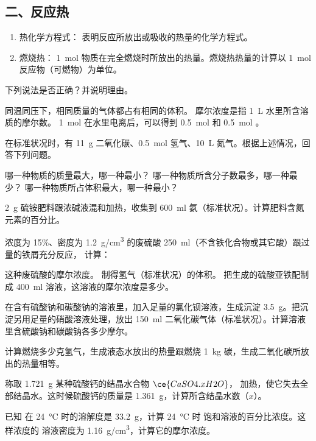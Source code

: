 \subsection*{二、反应热}
\begin{enumerate}[1.]
  \item 热化学方程式： 表明反应所放出或吸收的热量的化学方程式。
  \item 燃烧热： \qty{1}{mol} 物质在完全燃烧时所放出的热量。燃烧热热量的计算以 \qty{1}{mol} 反应物（可燃物）为单位。
\end{enumerate}

\begin{Review}
  \begin{question}
    \item 下列说法是否正确？并说明理由。
    \begin{tasks}
      \task 同温同压下，相同质量的气体都占有相同的体积。
      \task 摩尔浓度是指 \qty{1}{L} 水里所含溶质的摩尔数。
      \task \qty{1}{mol}  在水里电离后，可以得到 \qty{0.5}{mol}  和 \qty{0.5}{mol} 。
    \end{tasks}
    \item 在标准状况时，有 \qty{11}{g} 二氧化碳、\qty{0.5}{mol} 氢气、\qty{10}{L} 氮气。根据上述情况，回答下列问题。
    \begin{tasks}
      \task 哪一种物质的质量最大，哪一种最小？
      \task 哪一种物质所含分子数最多，哪一种最少？
      \task 哪一种物质所占体积最大，哪一种最小？
    \end{tasks}
    \item \qty{2}{g} 硫铵肥料跟浓碱液混和加热，收集到 \qty{600}{ml} 氨（标准状况）。计算肥料含氮元素的百分比。
    \item 浓度为 15\%、密度为 \qty{1.2}{g/cm^3} 的废硫酸 \qty{250}{ml}（不含铁化合物或其它酸）跟过量的铁屑充分反应， 计算：
    \begin{tasks}
      \task 这种废硫酸的摩尔浓度。
      \task 制得氢气（标准状况）的体积。
      \task 把生成的硫酸亚铁配制成 \qty{400}{ml} 溶液，这溶液的摩尔浓度是多少。
    \end{tasks}
    \item 在含有硫酸钠和碳酸钠的溶液里，加入足量的氯化钡溶液，生成沉淀 \qty{3.5}{g}。把沉淀另用足量的硝酸溶液处理，放出 \qty{150}{ml} 二氧化碳气体（标准状况）。计算溶液里含硫酸钠和碳酸钠各多少摩尔。
    \item 计算燃烧多少克氢气，生成液态水放出的热量跟燃烧 \qty{1}{kg} 碳，生成二氧化碳所放出的热量相等。
    \item 称取 \qty{1.721}{g} 某种硫酸钙的结晶水合物 $\ce{CaSO4 .x H2O}$， 加热，使它失去全部结晶水。这时候硫酸钙的质量是 \qty{1.361}{g}，计算所含结晶水数（$x$）。
    \item 已知  在 \qty{24}{\celsius} 时的溶解度是 \qty{33.2}{g}，计算 \qty{24}{\celsius} 时  饱和溶液的百分比浓度。这样浓度的  溶液密度为 \qty{1.16}{g/cm^3}，计算它的摩尔浓度。
  \end{question}
\end{Review}